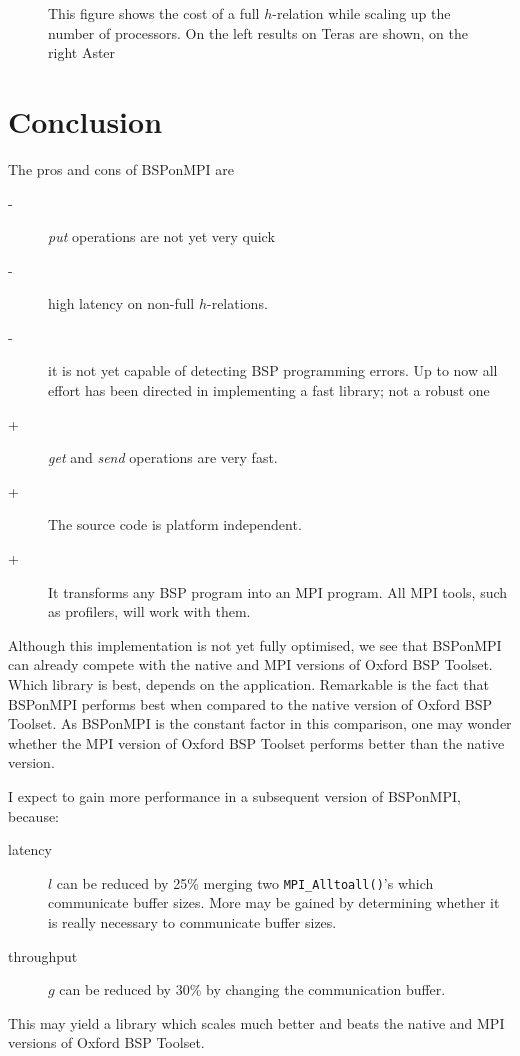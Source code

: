 \documentclass[a4paper]{article}
\begin{document}
\begin{figure}
\caption{This figure shows the cost of a full $h$-relation while scaling up
the number of processors. On the left results on Teras are shown, on the right
Aster}
\label{fig:latency}
\end{figure}

\section{Conclusion}
The pros and cons of BSPonMPI are
\begin{description}
\item[-] \emph{put} operations are not yet very quick
\item[-] high latency on non-full $h$-relations. 
\item[-] it is not yet capable of detecting BSP programming errors. Up to now
all effort has been directed in implementing a fast library; not a robust one
\item[+] \emph{get} and \emph{send} operations are very fast.
\item[+] The source code is platform independent.  
\item[+] It transforms any BSP program into an MPI program. All MPI tools,
such as profilers, will work with them.
\end{description}

Although this implementation is not yet fully optimised, we see that BSPonMPI
can already compete with the native and MPI versions of Oxford BSP Toolset.
Which library is best, depends on the application. Remarkable is the fact that
BSPonMPI performs best when compared to the native version of Oxford BSP
Toolset. As BSPonMPI is the constant factor in this comparison, one may wonder
whether the MPI version of Oxford BSP Toolset performs better than the native
version.

I expect to gain more performance in a subsequent version of BSPonMPI,
because: 
\begin{description}
\item[latency]  $l$ can be reduced by 25\%  merging two
\verb|MPI_Alltoall()|'s which communicate buffer sizes. More may be
gained by determining whether it is really necessary to communicate buffer
sizes.  
\item[throughput] $g$ can be reduced by 30\% by changing the communication
buffer. 
\end{description}
This may yield a library which scales much better and beats the native and MPI
versions of Oxford BSP Toolset.
\end{document}
